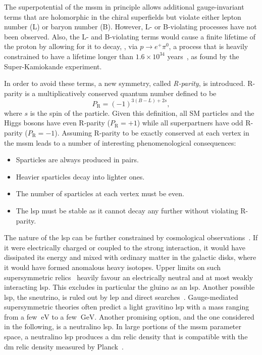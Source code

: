 The superpotential of the \gls{mssm} in principle allows additional gauge-invariant terms that are holomorphic in the chiral superfields but violate either lepton number (L) or baryon number (B). However, L- or B-violating processes have not been observed.
Also, the L- and B-violating terms would cause a finite lifetime of the proton by allowing for it to decay, \eg, via $p\rightarrow e^+ \pi^0$, a process that is heavily constrained to have a lifetime longer than $1.6\times 10^{34}$ years~\cite{Miura:2016krn}, as found by the Super-Kamiokande experiment.

In order to avoid these terms, a new symmetry, called \textit{R-parity}, is introduced. R-parity is a multiplicatively conserved quantum number defined to be
\begin{equation}
	P_\mathrm{R} = (-1)^{3(B-L)+2s},
	\label{eq:rparity}
\end{equation}
where $s$ is the spin of the particle. Given this definition, all SM particles and the Higgs bosons have even R-parity ($P_\mathrm{R} = +1$) while all superpartners have odd R-parity ($P_\mathrm{R} = -1$). Assuming R-parity to be exactly conserved at each vertex in the \gls{mssm} leads to a number of interesting phenomenological consequences:
\begin{itemize}
	\item Sparticles are always produced in pairs.
	\item Heavier sparticles decay into lighter ones.
	\item The number of sparticles at each vertex must be even.
	\item The \gls{lsp} must be stable as it cannot decay any further without violating R-parity.	
\end{itemize}
The nature of the \gls{lsp} can be further constrained by cosmological observations~\cite{Ellis:1998eh}. If it were electrically charged or coupled to the strong interaction, it would have dissipated its energy and mixed with ordinary matter in the galactic disks, where it would have formed anomalous heavy isotopes.
Upper limits on such supersymmetric relics~\cite{Ellis:1983ew} heavily favour an electrically neutral and at most weakly interacting \gls{lsp}. This excludes in particular the gluino as an \gls{lsp}.
Another possible \gls{lsp}, the sneutrino, is ruled out by \gls{lep} and direct searches~\cite{PhysRevLett.61.510,PhysRevD.48.5505,Akerib:2005zy}. Gauge-mediated supersymmetric theories often predict a light gravitino \gls{lsp} with a mass ranging from a few $\SI{}{\eV}$ to a few $\SI{}{\GeV}$.
Another promising option, and the one considered in the following, is a neutralino \gls{lsp}. In large portions of the \gls{mssm} parameter space, a neutralino \gls{lsp} produces a \gls{dm} relic density that is compatible with the \gls{dm} relic density measured by Planck~\cite{Aghanim:2018eyx,Ellis:1983ew}.

